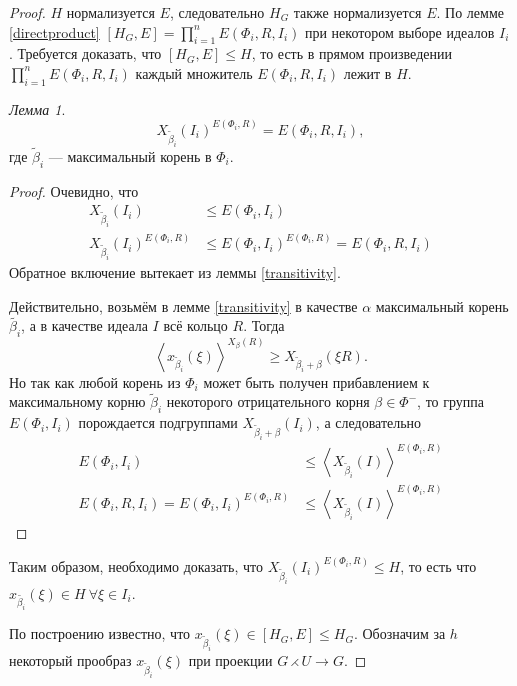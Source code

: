 \documentclass[10pt]{article}
\theoremstyle{remark}
\newtheorem{lm}{Лемма}
\renewcommand{\le}{\leqslant}
\renewcommand{\ge}{\geqslant}
\begin{document}
\begin{proof}
  $H$ нормализуется $E$, следовательно $H_G$ также нормализуется $E$. По лемме \ref{directproduct} $[H_G,E] = \prod_{i=1}^n E(\Phi_i,R,I_i)$ при некотором выборе идеалов $I_i$. Требуется доказать, что $[H_G,E] \le H$, то есть в прямом произведении $\prod_{i=1}^n E(\Phi_i,R,I_i)$ каждый множитель $E(\Phi_i,R,I_i)$  лежит в $H$.
  
\begin{lm}
  $$X_{\widetilde\beta_i}(I_i)^{E(\Phi_i,R)} = E(\Phi_i,R,I_i),$$
  где $\widetilde\beta_i$ --- максимальный корень в $\Phi_i$.
\end{lm}
\begin{proof}
  Очевидно, что
\begin{align*}
  X_{\widetilde\beta_i}(I_i) &\le E(\Phi_i,I_i) \\
  X_{\widetilde\beta_i}(I_i)^{E(\Phi_i,R)} &\le E(\Phi_i,I_i)^{E(\Phi_i,R)} = E(\Phi_i,R,I_i)
\end{align*}
  Обратное включение вытекает из леммы \ref{transitivity}.
  
  Действительно, возьмём в лемме \ref{transitivity} в качестве $\alpha$ максимальный корень $\widetilde{\beta_i}$, а в качестве идеала $I$ всё кольцо $R$. Тогда
  $$ \left< x_{\widetilde\beta_i}(\xi) \right>^{X_\beta(R)} \ge X_{\widetilde\beta_i + \beta}(\xi R). $$
  Но так как любой корень из $\Phi_i$ может быть получен прибавлением к максимальному корню $\widetilde\beta_i$ некоторого отрицательного корня $\beta \in \Phi^-$, то группа $E(\Phi_i,I_i)$ порождается подгруппами $X_{\widetilde\beta_i + \beta}(I_i)$, а следовательно 
\begin{align*}
E(\Phi_i,I_i) &\le \left< X_{\widetilde\beta_i}(I) \right>^{E(\Phi_i,R)}\\
  E(\Phi_i,R,I_i) = E(\Phi_i,I_i)^{E(\Phi_i,R)} &\le \left< X_{\widetilde\beta_i}(I) \right>^{E(\Phi_i,R)}
\end{align*}
\end{proof}

Таким образом, необходимо доказать, что $X_{\widetilde\beta_i}(I_i)^{E(\Phi_i,R)} \le H$, то есть что
$x_{\widetilde{\beta_i}}(\xi) \in H \ \forall \xi \in I_i$.

По построению известно, что $x_{\widetilde\beta_i}(\xi) \in [H_G,E] \le H_G$.
Обозначим за $h$ некоторый прообраз $x_{\widetilde\beta_i}(\xi)$ при проекции $G \rightthreetimes U \rightarrow G$.


\end{proof}
\end{document}
